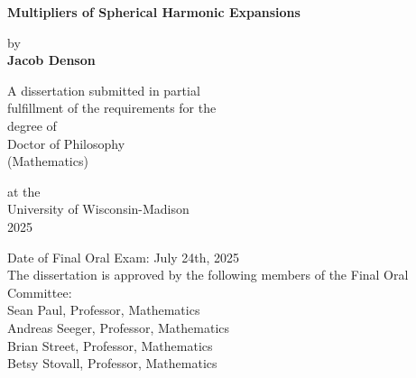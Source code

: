 
\begin{titlepage}
    \begin{center}
        \vspace*{1cm}
        
        \Huge
        \textbf{Multipliers of Spherical Harmonic Expansions}
    
        \vspace{1em}
        by\\
        \vspace{0.3em}
        \textbf{Jacob Denson}
        
        \vspace{1.8cm}
        
        A dissertation submitted in partial\\
        fulfillment of the requirements for the\\
        degree of\\

        \vspace{1cm}
        Doctor of Philosophy\\
        (Mathematics)\\
    
        \vspace{1.8cm}

        \Large
        at the\\University of Wisconsin-Madison\\
        2025\\
        \vspace{1.0cm}
        \begin{flushleft}
        \large
        Date of Final Oral Exam: July 24th, 2025\\
        The dissertation is approved by the following members of the Final Oral Committee: \\
        \setlength{\parindent}{10ex}
        Sean Paul, Professor, Mathematics\\Andreas Seeger, Professor, Mathematics\\
        Brian Street, Professor, Mathematics\\Betsy Stovall, Professor, Mathematics\\
        \end{flushleft}
        
    \end{center}
    
\end{titlepage}